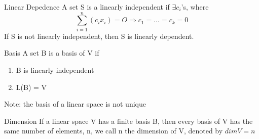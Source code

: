 \begin{definition}{Linear Depedence}  
  A set S is a linearly independent if $\exists c_{i}$'s, where
  \[\sum_{i = 1}^{n}(c_{i}x_{i}) = O \Rightarrow c_{1} =\dots=c_{k}=0\]
If S is not linearly independent, then S is linearly dependent.
\end{definition}
\begin{definition}{Basis}
  A set B is a basis of V if 
  \begin{enumerate}
    \item B is linearly independent
    \item L(B) = V

  \end{enumerate}
  
\end{definition}
Note: the basis of a linear space is not unique
\begin{definition}{Dimension}
  If a linear space V has a finite basis B, then every basis of V has the same number of elements, n,
  we call n the dimension of V, denoted by $dim V=n$
  
\end{definition}
